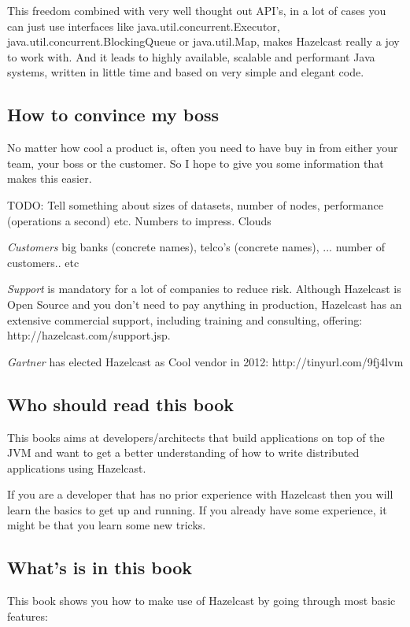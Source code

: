 This freedom combined with very well thought out API's, in a lot of cases you can just use interfaces like java.util.concurrent.Executor, java.util.concurrent.BlockingQueue or java.util.Map, makes Hazelcast really a joy to work with. And it leads to highly available, scalable and performant Java systems, written in little time and based on very simple and elegant code.

\subsection*{How to convince my boss}
No matter how cool a product is, often you need to have buy in from either your team, your boss or the customer. So I hope to give you some information that makes this easier.

TODO: Tell something about sizes of datasets, number of nodes, performance (operations a second) etc. Numbers to impress. Clouds

\emph{Customers} big banks (concrete names), telco's (concrete names), ... number of customers.. etc

\emph{Support} is mandatory for a lot of companies to reduce risk. Although Hazelcast is Open Source and you don't need to pay anything in production, Hazelcast has an extensive commercial support, including training and consulting,  offering: http://hazelcast.com/support.jsp. 

\emph{Gartner} has elected Hazelcast as Cool vendor in 2012: http://tinyurl.com/9fj4lvm

\subsection*{Who should read this book}
This books aims at developers/architects that build applications on top of the JVM and want to get a better understanding of how to write distributed applications using Hazelcast. 

If you are a developer that has no prior experience with Hazelcast then you will learn the basics to get up and running. If you already have some experience, it might be that you learn some new tricks.

\subsection*{What's is in this book}

This book shows you how to make use of Hazelcast by going through most basic features:

